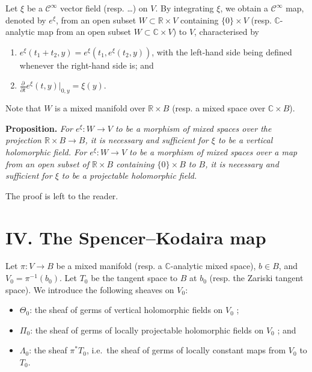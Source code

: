 \documentclass[british]{article}
\providecommand{\tightlist}{%
\setlength{\itemsep}{0pt}\setlength{\parskip}{0pt}}
\newenvironment{itenv}[1]
  {\phantomsection\par\smallskip\noindent\textbf{#1.}\itshape}
  {\par\smallskip}
\newcommand{\oldpage}[1]{\marginpar{\footnotesize$\Big\vert$ \textit{p.~#1}}}
\begin{document}
\oldpage{2-06}

Let \(\xi\) be a \(\mathscr{C}^\infty\) vector field (resp. \ldots) on
\(V\). By integrating \(\xi\), we obtain a \(\mathscr{C}^\infty\) map,
denoted by \(e^\xi\), from an open subset \(W\subset\mathbb{R}\times V\)
containing \(\{0\}\times V\) (resp. \(\mathbb{C}\)-analytic map from an
open subset \(W\subset\mathbb{C}\times V\)) to \(V\), characterised by

\begin{enumerate}
\def\labelenumi{\arabic{enumi}.}
\tightlist
\item
  \(e^\xi(t_1+t_2,y) = e^\xi(t_1,e^\xi(t_2,y))\), with the left-hand
  side being defined whenever the right-hand side is; and
\item
  \(\frac{\partial}{\partial t}e^\xi(t,y)|_{0,y} = \xi(y)\).
\end{enumerate}

Note that \(W\) is a mixed manifold over \(\mathbb{R}\times B\) (resp. a
mixed space over \(\mathbb{C}\times B\)).

\protect{}\label{two-proposition}
\begin{itenv}{Proposition}
For \(e^\xi\colon W\to V\) to be a morphism of mixed spaces over the
projection \(\mathbb{R}\times B\to B\), it is necessary and sufficient
for \(\xi\) to be a vertical holomorphic field. For
\(e^\xi\colon W\to V\) to be a morphism of mixed spaces over a map from
an open subset of \(\mathbb{R}\times B\) containing \(\{0\}\times B\) to
\(B\), it is necessary and sufficient for \(\xi\) to be a projectable
holomorphic field.

\end{itenv}

The proof is left to the reader.

\section*{IV. The Spencer--Kodaira map}\label{two-section-IV}

Let \(\pi\colon V\to B\) be a mixed manifold (resp. a
\(\mathbb{C}\)-analytic mixed space), \(b\in B\), and
\(V_0=\pi^{-1}(b_0)\). Let \(T_0\) be the tangent space to \(B\) at
\(b_0\) (resp. the Zariski tangent space). We introduce the following
sheaves on \(V_0\):

\begin{itemize}
\tightlist
\item
  \(\Theta_0\): the sheaf of germs of vertical holomorphic fields on
  \(V_0\) ;
\item
  \(\Pi_0\): the sheaf of germs of locally projectable holomorphic
  fields on \(V_0\) ; and
\item
  \(\Lambda_0\): the sheaf \(\pi^*T_0\), i.e.~the sheaf of germs of
  locally constant maps from \(V_0\) to \(T_0\).
\end{itemize}
\end{document}
